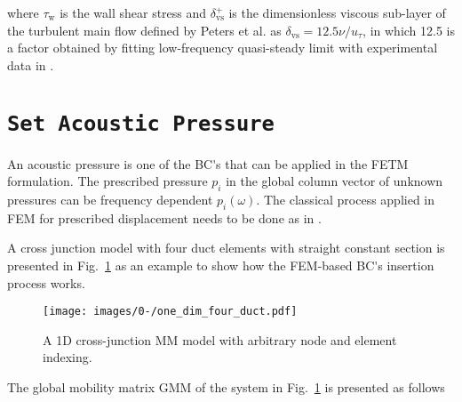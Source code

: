 \documentclass[12pt]{article}
\begin{document}

\noindent where $\tau_{\text{w}}$ is the wall shear stress and $\delta_{\text{vs}}^+$ is the dimensionless viscous sub-layer of the turbulent main flow defined by Peters et al. \cite{peters_hirschberg_reijnen_wijnands_1993, peters_thesis} as $\delta_{\text{vs}} = 12.5 \nu / u_{\tau}$, in which 12.5 is a factor obtained by fitting low-frequency quasi-steady limit with experimental data in \cite{ronneberger_ahrens_1977, peters_hirschberg_reijnen_wijnands_1993, peters_thesis}.

\section{\texttt{Set Acoustic Pressure}}

An acoustic pressure is one of the \acrfull{BC's} that can be applied in the \acrfull{FETM} formulation. The prescribed pressure $p_i$ in the global column vector of unknown pressures can be frequency dependent $p_i(\omega)$. The classical process applied in \acrshort{FEM} for prescribed displacement needs to be done as in \cite{eerden_phdthesis_2000,hughes}.

A cross junction model with four duct elements with straight constant section is presented in Fig.~\ref{fig:one_dim_ducts} as an example to show how the \acrshort{FEM}-based \acrshort{BC's} insertion process works.

\begin{figure}[h!]
	\centering
	\texttt{[image: images/0-/one\_dim\_four\_duct.pdf]}
	\caption{A 1D cross-junction \acrshort{MM} model with arbitrary node and element indexing.}
	\label{fig:one_dim_ducts}
\end{figure}

The global mobility matrix \acrshort{GMM} of the system in Fig.~\ref{fig:one_dim_ducts} is presented as follows
\end{document}
